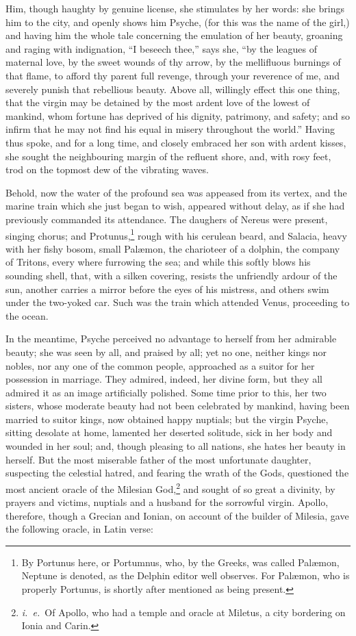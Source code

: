 \documentclass[12pt]{article}
\begin{document}
Him, though haughty by genuine license, she stimulates by her words: she brings
him to the city, and openly shows him Psyche, (for this was the name of the
girl,) and having him the whole tale concerning the emulation of her beauty,
groaning and raging with indignation, ``I beseech thee,'' says she, ``by the
leagues of maternal love, by the sweet wounds of thy arrow, by the mellifluous
burnings of that flame, to afford thy parent full revenge, through your
reverence of me, and severely punish that rebellious beauty. Above all,
willingly effect this one thing, that the virgin may be detained by the most
ardent love of the lowest of mankind, whom fortune has deprived of his dignity,
patrimony, and safety; and so infirm that he may not find his equal in misery
throughout the world.'' Having thus spoke, and for a long time, and closely
embraced her son with ardent kisses, she sought the neighbouring margin of the
refluent shore, and, with rosy feet, trod on the topmost dew of the vibrating
waves.

Behold, now the water of the profound sea was appeased from its vertex, and the
marine train which she just began to wish, appeared without delay, as if she
had previously commanded its attendance. The daughers of Nereus were present,
singing chorus; and Protunus,\footnote{By Portunus here, or Portumnus, who, by
the Greeks, was called Pal{\ae}mon, Neptune is denoted, as the Delphin editor
well observes. For Pal{\ae}mon, who is properly Portunus, is shortly after
mentioned as being present.} rough with his cerulean beard, and Salacia, heavy
with her fishy bosom, small Pal{\ae}mon, the charioteer of a dolphin, the
company of Tritons, every where furrowing the sea; and while this softly blows
his sounding shell, that, with a silken covering, resists the unfriendly ardour
of the sun, another carries a mirror before the eyes of his mistress, and
others swim under the two-yoked car. Such was the train which attended Venus,
proceeding to the ocean.

In the meantime, Psyche perceived no advantage to herself from her admirable
beauty; she was seen by all, and praised by all; yet no one, neither kings nor
nobles, nor any one of the common people, approached as a suitor for her
possession in marriage. They admired, indeed, her divine form, but they all
admired it as an image artificially polished. Some time prior to this, her two
sisters, whose moderate beauty had not been celebrated by mankind, having been
married to suitor kings, now obtained happy nuptials; but the virgin Psyche,
sitting desolate at home, lamented her deserted solitude, sick in her body and
wounded in her soul; and, though pleasing to all nations, she hates her beauty
in herself. But the most miserable father of the most unfortunate daughter,
suspecting the celestial hatred, and fearing the wrath of the Gods, questioned
the most ancient oracle of the Milesian God,\footnote{\textit{i.~e.}~Of Apollo,
who had a temple and oracle at Miletus, a city bordering on Ionia and Carin.}
and sought of so great a divinity, by prayers and victims, nuptials and a
husband for the sorrowful virgin. Apollo, therefore, though a Grecian and
Ionian, on account of the builder of Milesia, gave the following oracle, in
Latin verse:
\end{document}
